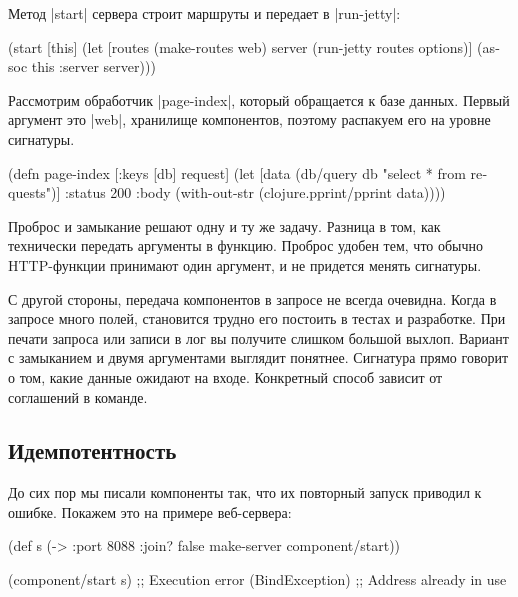 Метод \spverb|start| сервера строит маршруты и передает в \spverb|run-jetty|:

\begin{english}
  \begin{clojure}
(start [this]
  (let [routes (make-routes web)
        server (run-jetty routes options)]
    (assoc this :server server)))
  \end{clojure}
\end{english}

Рассмотрим обработчик \spverb|page-index|, который обращается к базе
данных. Первый аргумент это \spverb|web|, хранилище компонентов, поэтому
распакуем его на уровне сигнатуры.

\begin{english}
  \begin{clojure}
(defn page-index
  [{:keys [db]} request]
  (let [data (db/query db "select * from requests")]
    {:status 200
     :body (with-out-str
             (clojure.pprint/pprint data))}))
  \end{clojure}
\end{english}

Проброс и замыкание решают одну и ту же задачу. Разница в том, как технически
передать аргументы в функцию. Проброс удобен тем, что обычно HTTP-функции
принимают один аргумент, и не придется менять сигнатуры.

С другой стороны, передача компонентов в запросе не всегда очевидна. Когда в
запросе много полей, становится трудно его постоить в тестах и разработке. При
печати запроса или записи в лог вы получите слишком большой выхлоп. Вариант с
замыканием и двумя аргументами выглядит понятнее. Сигнатура прямо говорит о том,
какие данные ожидают на входе. Конкретный способ зависит от соглашений в
команде.

\subsection{Идемпотентность}

До сих пор мы писали компоненты так, что их повторный запуск приводил к
ошибке. Покажем это на примере веб-сервера:

\begin{english}
  \begin{clojure}
(def s (-> {:port 8088 :join? false}
           make-server
           component/start))

(component/start s)
;; Execution error (BindException)
;; Address already in use
  \end{clojure}
\end{english}

